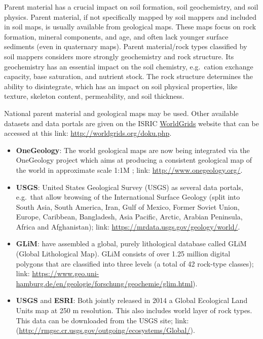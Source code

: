 \documentclass[10pt,b5paper,]{book}
\theoremstyle{definition}
\theoremstyle{definition}
\theoremstyle{definition}
\theoremstyle{remark}
\begin{document}
Parent material has a crucial impact on soil formation, soil
geochemistry, and soil physics. Parent material, if not specifically
mapped by soil mappers and included in soil maps, is usually available
from geological maps. These maps focus on rock formation, mineral
components, and age, and often lack younger surface sediments (even in
quaternary maps). Parent material/rock types classified by soil mappers
considers more strongly geochemistry and rock structure. Its
geochemistry has an essential impact on the soil chemistry, e.g.~cation
exchange capacity, base saturation, and nutrient stock. The rock
structure determines the ability to disintegrate, which has an impact on
soil physical properties, like texture, skeleton content, permeability,
and soil thickness.

National parent material and geological maps may be used. Other
available datasets and data portals are given on the ISRIC
\href{http://worldgrids.org/doku.php}{WorldGrids} website that can be
accessed at this link: \url{http://worldgrids.org/doku.php}.

\begin{itemize}
\item
  \textbf{OneGeology}: The world geological maps are now being
  integrated via the OneGeology project which aims at producing a
  consistent geological map of the world in approximate scale 1:1M
  \citep{jackson2007onegeology}; link: \url{http://www.onegeology.org/}.
\item
  \textbf{USGS}: United States Geological Survey (USGS) as several data
  portals, e.g.~that allow browsing of the International Surface Geology
  (split into South Asia, South America, Iran, Gulf of Mexico, Former
  Soviet Union, Europe, Caribbean, Bangladesh, Asia Pacific, Arctic,
  Arabian Peninsula, Africa and Afghanistan); link:
  \url{https://mrdata.usgs.gov/geology/world/}.
\item
  \textbf{GLiM}: \citet{hartmann2012new} have assembled a global, purely
  lithological database called GLiM (Global Lithological Map). GLiM
  consists of over 1.25 million digital polygons that are classified
  into three levels (a total of 42 rock-type classes); link:
  \url{https://www.geo.uni-hamburg.de/en/geologie/forschung/geochemie/glim.html}).
\item
  \textbf{USGS} and \textbf{ESRI}: Both jointly released in 2014 a
  Global Ecological Land Units map at 250 m resolution. This also
  includes world layer of rock types. This data can be downloaded from
  the USGS site; link:
  (\url{http://rmgsc.cr.usgs.gov/outgoing/ecosystems/Global/}).
\end{itemize}
\end{document}
